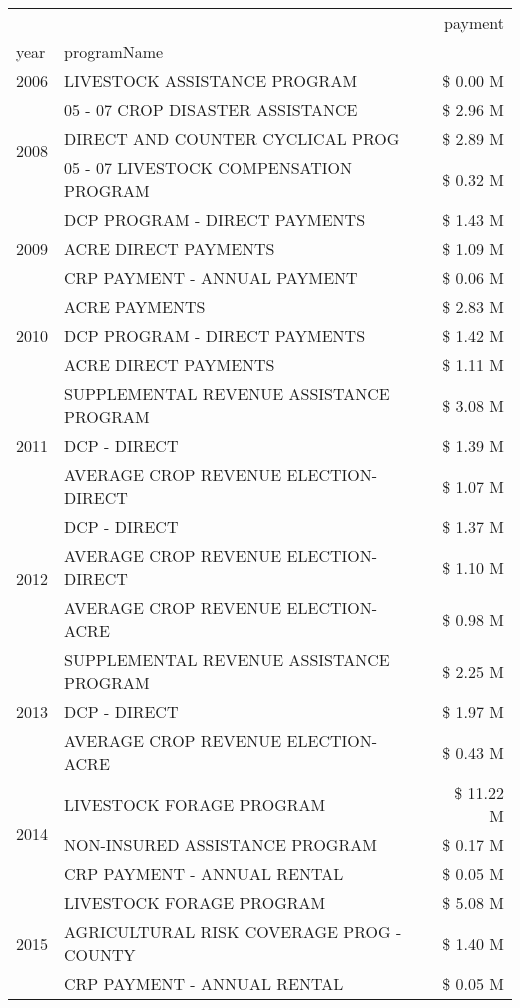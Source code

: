 \begin{tabular}{llr}
\toprule
 &  & payment \\
year & programName &  \\
\midrule
2006 & LIVESTOCK ASSISTANCE PROGRAM & \$ 0.00 M \\
\cline{1-3}
\multirow[t]{3}{*}{2008} & 05 - 07 CROP DISASTER ASSISTANCE & \$ 2.96 M \\
 & DIRECT AND COUNTER CYCLICAL PROG & \$ 2.89 M \\
 & 05 - 07 LIVESTOCK COMPENSATION PROGRAM & \$ 0.32 M \\
\cline{1-3}
\multirow[t]{3}{*}{2009} & DCP PROGRAM - DIRECT PAYMENTS & \$ 1.43 M \\
 & ACRE DIRECT PAYMENTS & \$ 1.09 M \\
 & CRP PAYMENT - ANNUAL PAYMENT & \$ 0.06 M \\
\cline{1-3}
\multirow[t]{3}{*}{2010} & ACRE PAYMENTS & \$ 2.83 M \\
 & DCP PROGRAM - DIRECT PAYMENTS & \$ 1.42 M \\
 & ACRE DIRECT PAYMENTS & \$ 1.11 M \\
\cline{1-3}
\multirow[t]{3}{*}{2011} & SUPPLEMENTAL REVENUE ASSISTANCE PROGRAM & \$ 3.08 M \\
 & DCP - DIRECT & \$ 1.39 M \\
 & AVERAGE CROP REVENUE ELECTION-DIRECT & \$ 1.07 M \\
\cline{1-3}
\multirow[t]{3}{*}{2012} & DCP - DIRECT & \$ 1.37 M \\
 & AVERAGE CROP REVENUE ELECTION-DIRECT & \$ 1.10 M \\
 & AVERAGE CROP REVENUE ELECTION-ACRE & \$ 0.98 M \\
\cline{1-3}
\multirow[t]{3}{*}{2013} & SUPPLEMENTAL REVENUE ASSISTANCE PROGRAM & \$ 2.25 M \\
 & DCP - DIRECT & \$ 1.97 M \\
 & AVERAGE CROP REVENUE ELECTION-ACRE & \$ 0.43 M \\
\cline{1-3}
\multirow[t]{3}{*}{2014} & LIVESTOCK FORAGE PROGRAM & \$ 11.22 M \\
 & NON-INSURED ASSISTANCE PROGRAM & \$ 0.17 M \\
 & CRP PAYMENT - ANNUAL RENTAL & \$ 0.05 M \\
\cline{1-3}
\multirow[t]{3}{*}{2015} & LIVESTOCK FORAGE PROGRAM & \$ 5.08 M \\
 & AGRICULTURAL RISK COVERAGE PROG - COUNTY & \$ 1.40 M \\
 & CRP PAYMENT - ANNUAL RENTAL & \$ 0.05 M \\

\end{tabular}
